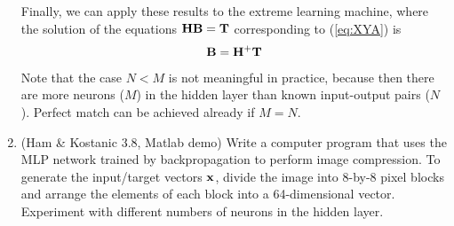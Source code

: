 \begin{enumerate}
\begin{solution}
    Finally, we can apply these results to the extreme learning machine, where the solution
    of the equations ${\bf HB} = {\bf T}$ corresponding to (\ref{eq:XYA}) is
    \begin{equation}
      {\bf B} = {\bf H}^+{\bf T}
      \label{eq:B}
    \end{equation}
    Note that the case $N < M$ is not meaningful in practice, because then there are
    more neurons ($M$) in the hidden layer than known input-output pairs ($N$). Perfect
    match can be achieved already if $M = N$.




  \end{solution}
  

\item (Ham \& Kostanic 3.8, Matlab demo) Write a computer program that uses the MLP
  network trained by backpropagation to perform image compression. To
  generate the input/target vectors ${\bf{x}}$, divide the image into
  8-by-8 pixel blocks and arrange the elements of each block into a
  64-dimensional vector. Experiment with different numbers of neurons
  in the hidden layer.

  \begin{solution}

  \end{solution}
  
\end{enumerate}

